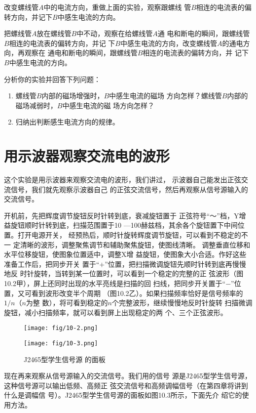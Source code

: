 改变螺线管$A$中的电流方向，重做上面的实验，观察跟螺线
管$B$相连的电流表的偏转方向，并记下$B$中感生电流的方向。

把螺线管$A$放在螺线管$B$中不动，观察在给螺线管$A$通
电和断电的瞬间，跟螺线管$B$相连的电流表的偏转方向，并记
下$B$中感生电流的方向，改变螺线管$A$的通电方向，再观察在
通电和断电的瞬间，跟螺线管$B$相连的电流表的偏转方向，并
记下$B$中感生电流的方向。

分析你的实验并回答下列问题：
\begin{enumerate}
    \item 螺线管$B$内部的磁场增强时，$B$中感生电流的磁场
方向怎样？螺线管$B$内部的磁场减弱时，$B$中感生电流的磁
场方向怎样？
\item 归纳出判断感生电流方向的规律。
\end{enumerate}

\section{用示波器观察交流电的波形}
这个实验是用示波器来观察交流电的波形，我们讲过，
示波器自己能发出正弦交流信号，我们就先观察示波器自己
的正弦交流信号，然后再观察从信号源输入的交流信号。

开机前，先把辉度调节旋钮反时针转到底，衰减旋钮置于
正弦符号“～”档，Y增益旋钮顺时针转到底，扫描范围置于10
—100赫兹档，其余各个旋钮置下中间位置。打开电源开关，
经预热后，顺时针旋转辉度调节旋钮，可以看到不稳定的不一
定清晰的波形，调整聚焦调节和辅助聚焦旋钮，使图线清晰。
调整垂直位移和水平位移旋钮，使图象位置适中，调整X增
益旋钮，使图象大小合适。作好这些准备工作后，把同步开关
置于“$+$”位置，把扫描微调旋钮先顺时针转到底再慢慢地反
时针旋转，当转到某一位置时，可以看到一个稳定的完整的正
弦波形（图10.2甲），屏上还同时出现的水平亮线是扫描的回
扫线，把同步开关置于“$-$”位置，又可看到波形改变半个周期
（图10.2乙）。如果扫描频率恰好是信号频率的$1/n$（$n$为整
数），将可看到稳定的$n$个完整波形，继续慢慢地反时针旋转
扫描微调旋钮，减小扫描频率，就可以看到屏上出现稳定的两
个、三个正弦波形。

\begin{figure}[htp]\centering
    \texttt{[image: fig/10-2.png]}
    \caption{}
    \end{figure}

    \begin{figure}[htp]\centering
        \texttt{[image: fig/10-3.png]}
        \caption{J2465型学生信号源
        的面板}
        \end{figure}

现在再来观察从信号源输入的交流信号。我们用的信号
源是J2465型学生信号源，这种信号源可以输出低频、高频正
弦交流信号和高频调幅信号（在第四章将讲到什么是调幅信
号）。J2465型学生信号源的面板如图10.3所示，下面先介
绍它的使用方法。

